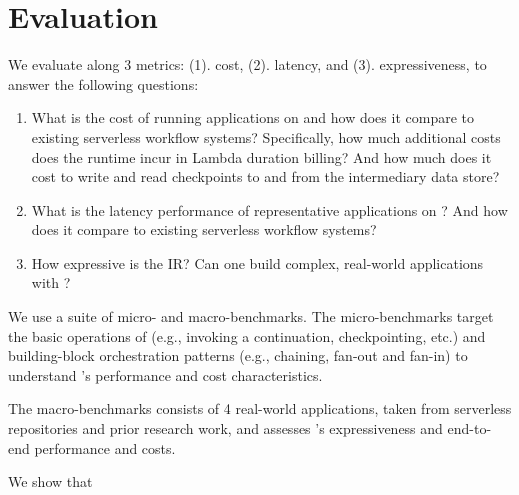 
\section{Evaluation}\label{sec:eval}

We evaluate \name{} along 3 metrics: (1). cost, (2). latency, and (3).
expressiveness, to answer the following questions:

\begin{enumerate}

    \item What is the cost of running applications on \name{} and how does it
    compare to existing serverless workflow systems? Specifically, how much
    additional costs does the \name{} runtime incur in Lambda duration
    billing? And how much does it cost to write and read checkpoints to and
    from the intermediary data store?

    \item What is the latency performance of representative applications on
    \name{}? And how does it compare to existing serverless workflow systems?

    \item How expressive is the \name{} IR? Can one build complex, real-world
    applications with \name{}?

\end{enumerate}


We use a suite of micro- and macro-benchmarks. The micro-benchmarks target the
basic operations of \name{} (e.g., invoking a continuation, checkpointing,
etc.) and building-block orchestration patterns (e.g., chaining, fan-out and
fan-in) to understand \name{}'s performance and cost characteristics.

The macro-benchmarks consists of 4 real-world applications, taken from
serverless repositories and prior research work, and assesses \name{}'s
expressiveness and end-to-end performance and costs.

We show that 

